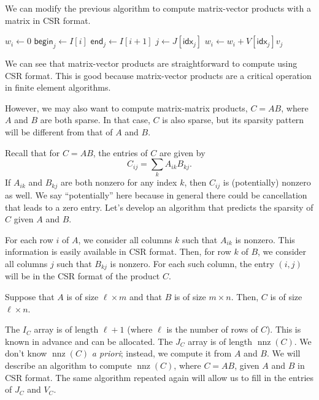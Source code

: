 \documentclass[12pt]{article}
\DeclareMathOperator{\nnz}{nnz}
\begin{document}
We can modify the previous algorithm to compute matrix-vector products with a matrix in CSR format.

\begin{algorithm}[H]
   \caption{Matrix-vector product in CSR format}
   \begin{algorithmic}[1]
         \State $w_i \gets 0$
         \State $\textsf{begin}_j \gets I[i]$
         \State $\textsf{end}_j \gets I[i+1]$
            \State $j \gets J[\textsf{idx}_j]$
            \State $w_i \gets w_i + V[\textsf{idx}_j] v_j$
         \EndFor
      \EndFor
   \end{algorithmic}
\end{algorithm}

We can see that matrix-vector products are straightforward to compute using CSR format.
This is good because matrix-vector products are a critical operation in finite element algorithms.

However, we may also want to compute matrix-matrix products, $C = AB$, where $A$ and $B$ are both sparse.
In that case, $C$ is also sparse, but its sparsity pattern will be different from that of $A$ and $B$.

Recall that for $C = AB$, the entries of $C$ are given by
\[
   C_{ij} = \sum_k A_{ik} B_{kj}.
\]
If $A_{ik}$ and $B_{kj}$ are both nonzero for any index $k$, then $C_{ij}$ is (potentially) nonzero as well.
We say ``potentially'' here because in general there could be cancellation that leads to a zero entry.
Let's develop an algorithm that predicts the sparsity of $C$ given $A$ and $B$.

For each row $i$ of $A$, we consider all columns $k$ such that $A_{ik}$ is nonzero.
This information is easily available in CSR format.
Then, for row $k$ of $B$, we consider all columns $j$ such that $B_{kj}$ is nonzero.
For each such column, the entry $(i,j)$ will be in the CSR format of the product $C$.

Suppose that $A$ is of size $\ell \times m$ and that $B$ is of size $m \times n$.
Then, $C$ is of size $\ell \times n$.

The $I_C$ array is of length $\ell + 1$ (where $\ell$ is the number of rows of $C$).
This is known in advance and can be allocated.
The $J_C$ array is of length $\nnz(C)$.
We don't know $\nnz(C)$ \textit{a priori}; instead, we compute it from $A$ and $B$.
We will describe an algorithm to compute $\nnz(C)$, where $C = AB$, given $A$ and $B$ in CSR format.
The same algorithm repeated again will allow us to fill in the entries of $J_C$ and $V_C$.
\end{document}
